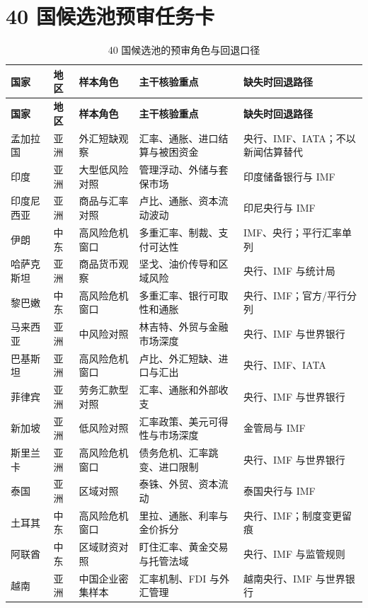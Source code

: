 \documentclass[UTF8,12pt,openany]{ctexbook}
\begin{document}
\section{40 国候选池预审任务卡}
\small
\begin{longtable}{p{2.1cm}p{1.4cm}p{2.8cm}p{3.6cm}p{3.3cm}}
\caption{40 国候选池的预审角色与回退口径}\label{tab:country-task-card}\\
\toprule
\textbf{国家} & \textbf{地区} & \textbf{样本角色} & \textbf{主干核验重点} & \textbf{缺失时回退路径}\\
\midrule
\endfirsthead
\toprule
\textbf{国家} & \textbf{地区} & \textbf{样本角色} & \textbf{主干核验重点} & \textbf{缺失时回退路径}\\
\midrule
\endhead
孟加拉国 & 亚洲 & 外汇短缺观察 & 汇率、通胀、进口结算与被困资金 & 央行、IMF、IATA；不以新闻估算替代\\
印度 & 亚洲 & 大型低风险对照 & 管理浮动、外储与套保市场 & 印度储备银行与 IMF\\
印度尼西亚 & 亚洲 & 商品与汇率对照 & 卢比、通胀、资本流动波动 & 印尼央行与 IMF\\
伊朗 & 中东 & 高风险危机窗口 & 多重汇率、制裁、支付可达性 & IMF、央行；平行汇率单列\\
哈萨克斯坦 & 亚洲 & 商品货币观察 & 坚戈、油价传导和区域风险 & 央行、IMF 与统计局\\
黎巴嫩 & 中东 & 高风险危机窗口 & 多重汇率、银行可取性和通胀 & 央行、IMF；官方/平行分列\\
马来西亚 & 亚洲 & 中风险对照 & 林吉特、外贸与金融市场深度 & 央行、IMF 与世界银行\\
巴基斯坦 & 亚洲 & 高风险危机窗口 & 卢比、外汇短缺、进口与汇出 & 央行、IMF、IATA\\
菲律宾 & 亚洲 & 劳务汇款型对照 & 汇率、通胀和外部收支 & 央行、IMF 与世界银行\\
新加坡 & 亚洲 & 低风险对照 & 汇率政策、美元可得性与市场深度 & 金管局与 IMF\\
斯里兰卡 & 亚洲 & 高风险危机窗口 & 债务危机、汇率跳变、进口限制 & 央行、IMF 与世界银行\\
泰国 & 亚洲 & 区域对照 & 泰铢、外贸、资本流动 & 泰国央行与 IMF\\
土耳其 & 中东 & 高风险危机窗口 & 里拉、通胀、利率与金价拆分 & 央行、IMF；制度变更留痕\\
阿联酋 & 中东 & 区域财资对照 & 盯住汇率、黄金交易与托管法域 & 央行、IMF 与监管规则\\
越南 & 亚洲 & 中国企业密集样本 & 汇率机制、FDI 与外汇管理 & 越南央行、IMF 与世界银行\\

\end{longtable}
\end{document}
